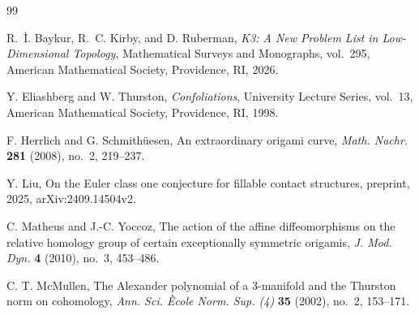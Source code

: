 \documentclass[10pt,reqno]{amsart}
\theoremstyle{definition}
\begin{document}
\begin{thebibliography}{99}

R.~\.{I}. Baykur, R.~C. Kirby, and D. Ruberman,
\emph{K3: A New Problem List in Low-Dimensional Topology},
Mathematical Surveys and Monographs, vol.~295,
American Mathematical Society, Providence, RI, 2026.

Y. Eliashberg and W. Thurston,
\emph{Confoliations},
University Lecture Series, vol.~13,
American Mathematical Society, Providence, RI, 1998.

F. Herrlich and G. Schmith\"uesen,
An extraordinary origami curve,
\emph{Math. Nachr.} \textbf{281} (2008), no.~2, 219--237.

Y. Liu,
On the Euler class one conjecture for fillable contact structures,
preprint, 2025, arXiv:2409.14504v2.

C. Matheus and J.-C. Yoccoz,
The action of the affine diffeomorphisms on the relative homology group of
certain exceptionally symmetric origamis,
\emph{J. Mod. Dyn.} \textbf{4} (2010), no.~3, 453--486.

C. T. McMullen,
The Alexander polynomial of a 3-manifold and the Thurston norm on cohomology,
\emph{Ann. Sci. \`Ecole Norm. Sup. (4)} \textbf{35} (2002), no.~2, 153--171.

\end{thebibliography}
\end{document}
